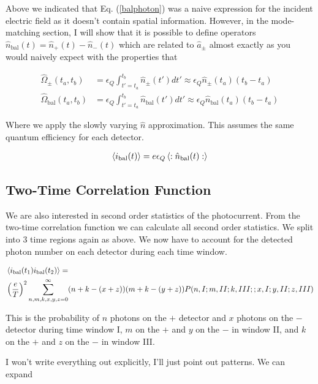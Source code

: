 \documentclass[12pt]{article}
\begin{document}
Above we indicated that Eq. (\ref{balphoton}) was a naive expression for the incident electric field as it doesn't contain spatial information. However, in the mode-matching section, I will show that it is possible to define operators $\hat{n}_{\text{bal}}(t) = \hat{n}_+(t) - \hat{n}_-(t)$ which are related to $\hat{a}_{\pm}$ almost exactly as you would naively expect with the properties that

\begin{align}
\hat{\Omega}_{\pm}(t_a,t_b) &= \epsilon_Q\int_{t'=t_a}^{t_b} \hat{n}_{\pm}(t') dt' \approx \epsilon_Q \hat{n}_{\pm}(t_a) (t_b-t_a)\\
\hat{\Omega}_{\text{bal}}(t_a,t_b) &= \epsilon_Q\int_{t'=t_a}^{t_b} \hat{n}_{\text{bal}}(t') dt' \approx \epsilon_Q \hat{n}_{\text{bal}}(t_a) (t_b-t_a)
\end{align}

Where we apply the slowly varying $\hat{n}$ approximation. This assumes the same quantum efficiency for each detector.

\begin{align}
\Braket{i_{\text{bal}}(t)} = e\epsilon_Q \Braket{:\hat{n}_{\text{bal}}(t):}
\end{align}

\subsection{Two-Time Correlation Function}

We are also interested in second order statistics of the photocurrent. From the two-time correlation function we can calculate all second order statistics. We split into 3 time regions again as above. We now have to account for the detected photon number on each detector during each time window.

\begin{align}
&\Braket{i_{\text{bal}}(t_1)i_{\text{bal}}(t_2)} =\\
&\left(\frac{e}{T}\right)^2 \sum_{n,m,k,x,y,z=0}^{\infty} (n+k-(x+z))(m+k-(y+z))P(n,I;m,II;k,III ;; x,I ; y,II ; z,III)
\end{align}

This is the probability of $n$ photons on the $+$ detector and $x$ photons on the $-$ detector during time window I, $m$ on the $+$ and $y$ on the $-$ in window II, and $k$ on the $+$ and $z$ on the $-$ in window III.

I won't write everything out explicitly, I'll just point out patterns. We can expand
\end{document}
